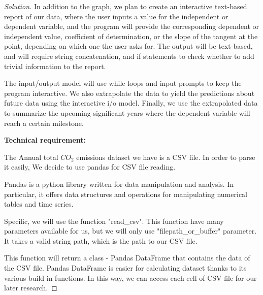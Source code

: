 \documentclass[12pt]{article}
\newenvironment{solution}
  {\renewcommand\qedsymbol{$\blacksquare$}
  \begin{proof}[Solution]}
  {\end{proof}}
\renewcommand\qedsymbol{$\blacksquare$}
\begin{document}
\begin{enumerate}
\begin{solution}
In addition to the graph, we plan to create an interactive text-based report of our data, where the user  inputs a value for the independent or dependent variable, and the program will provide the corresponding dependent or independent value, coefficient of determination, or the slope of the tangent at the point, depending on which one the user asks for. The output will be text-based, and will require string concatenation, and if statements to check whether to add trivial information to the report. 

The input/output model will use while loops and input prompts to keep the program interactive. We also extrapolate the data to yield the predictions about future data using the interactive i/o model. Finally, we use the extrapolated data to summarize the upcoming significant years where the dependent variable will reach a certain milestone.


\textbf{Technical requirement:}

The Annual total $CO_2$ emissions dataset we have is a CSV file. In order to parse it easily, We decide to use pandas for CSV file reading.

Pandas is a python library written for data manipulation and analysis. 
In particular, it offers data structures and operations for manipulating numerical tables and time series.

Specific, we will use the function "read\_csv". This function have many parameters available for us, but we will only use "filepath\_or\_buffer" parameter.
It takes a valid string path, which is the path to our CSV file.

This function will return a class - Pandas DataFrame that contains the data of the CSV file. Pandas DataFrame is easier for calculating dataset thanks to its various build in functions.
In this way, we can access each cell of CSV file for our later research.

\end{solution}

\maketitle

\newpage

 \end{enumerate}
\end{document}
